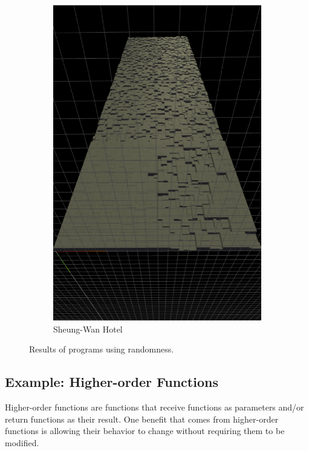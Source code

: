 \begin{figure}
\begin{subfigure}[b]{0.32\linewidth}
    \includegraphics[width=1.0\linewidth]{./images/all_examples/sheung_wan_hotel_crop}
    \caption{Sheung-Wan Hotel}
    \label{fig:ex:sheung:wan}
  \end{subfigure}
  \caption{Results of programs using randomness.}
  \label{fig:rand:progs}
\end{figure}


\subsection{Example: Higher-order Functions}
Higher-order functions are functions that receive functions as parameters and/or return functions as their result.
One benefit that comes from higher-order functions is allowing their behavior to change without requiring them to be modified.

